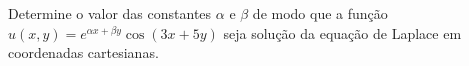 \linespread{1.5}
Determine o valor das constantes $\alpha$ e $\beta$ de modo que a função $u(x,y) = e^{\alpha x + \beta y}\cos(3x + 5y)$ seja solução da equação de Laplace em coordenadas cartesianas.
